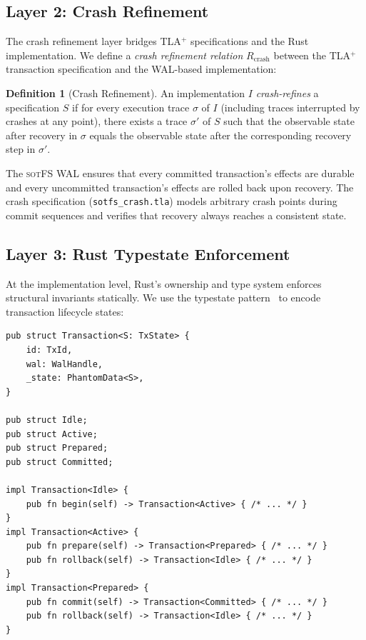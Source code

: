 \documentclass[11pt,a4paper]{article}
\theoremstyle{definition}
\newtheorem{definition}{Definition}[section]
\theoremstyle{remark}
\newcommand{\sotfs}{\textsc{sotFS}}
\begin{document}
\subsection{Layer 2: Crash Refinement}
\label{sec:verif-crash}

The crash refinement layer bridges TLA$^+$ specifications and the
Rust implementation. We define a \emph{crash refinement relation}
$R_{\mathrm{crash}}$ between the TLA$^+$ transaction specification
and the WAL-based implementation:

\begin{definition}[Crash Refinement]
\label{def:crash-refinement}
An implementation $I$ \emph{crash-refines} a specification $S$ if for
every execution trace $\sigma$ of $I$ (including traces interrupted by
crashes at any point), there exists a trace $\sigma'$ of $S$ such that
the observable state after recovery in $\sigma$ equals the observable
state after the corresponding recovery step in $\sigma'$.
\end{definition}

The \sotfs{} WAL ensures that every committed transaction's effects
are durable and every uncommitted transaction's effects are rolled
back upon recovery. The crash specification
(\texttt{sotfs\_crash.tla}) models arbitrary crash points during
commit sequences and verifies that recovery always reaches a
consistent state.

\subsection{Layer 3: Rust Typestate Enforcement}
\label{sec:verif-typestate}

At the implementation level, Rust's ownership and type system enforces
structural invariants statically. We use the typestate
pattern~\cite{kadekodi2024} to encode transaction lifecycle states:

\begin{lstlisting}[caption={Typestate encoding for transactions.},label=lst:typestate]
pub struct Transaction<S: TxState> {
    id: TxId,
    wal: WalHandle,
    _state: PhantomData<S>,
}

pub struct Idle;
pub struct Active;
pub struct Prepared;
pub struct Committed;

impl Transaction<Idle> {
    pub fn begin(self) -> Transaction<Active> { /* ... */ }
}
impl Transaction<Active> {
    pub fn prepare(self) -> Transaction<Prepared> { /* ... */ }
    pub fn rollback(self) -> Transaction<Idle> { /* ... */ }
}
impl Transaction<Prepared> {
    pub fn commit(self) -> Transaction<Committed> { /* ... */ }
    pub fn rollback(self) -> Transaction<Idle> { /* ... */ }
}
\end{lstlisting}
\end{document}
